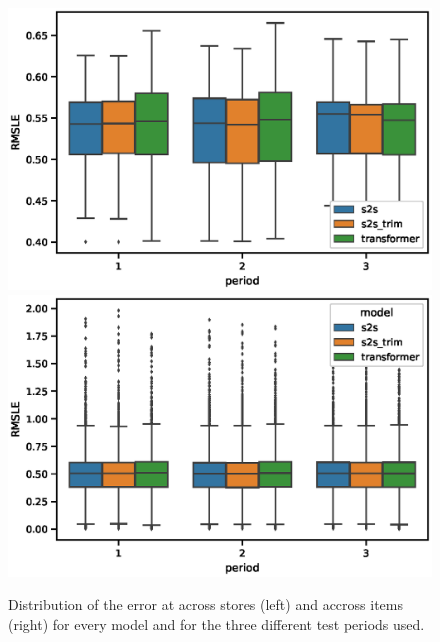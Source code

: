 \documentclass{elsarticle}
\begin{document}
	
	    \begin{figure}[h!]
		\centering
		\includegraphics[width=0.48\linewidth]{img/rmsle_storewise}
		\includegraphics[width=0.48\linewidth]{img/rmsle_itemwise}
		\caption{Distribution of the error at across stores (left) and accross items (right) for every model  and for the three different test periods used.}
		\label{fig:stores_items_performance}
	\end{figure}

	
	
\end{document}
